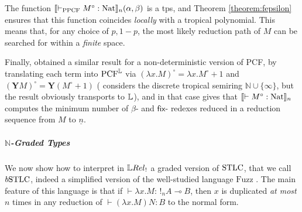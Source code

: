 \begin{remark}
The function $\llbracket\vdash_{\mathrm{PPCF}} M^{\circ}:\mathrm{Nat}\rrbracket_{n}(\alpha,\beta)$ is a tps, and Theorem \ref{theorem:fepsilon} ensures that this function coincides \emph{locally} with a tropical polynomial. This means that, for any choice of $p,1-p$, the most likely reduction path of $M$ can be searched for within a \emph{finite} space.
\end{remark}

Finally, \cite{Manzo2013} obtained a similar result for a non-deterministic version of PCF, by translating each term into $\mathrm{PCF}^{\mathbb{L}}$ via $(\lambda x.M)^{\circ}=\lambda x.M^{\circ}+1$ and $(\mathbf YM)^{\circ}= \mathbf Y(M^{\circ}+1)$
(\cite{Manzo2013} considers the discrete tropical semiring $\mathbb N\cup\{\infty\}$, but the result obviously transports to $\mathbb{L}$), and in that case \cite[Corollary VI.10]{Manzo2013} gives that $\llbracket\vdash M^{\circ}:\mathrm{Nat}\rrbracket_{n}$ computes the minimum number of $\beta$- and $\mathsf{fix}$- redexes reduced in a reduction sequence from $M $ to $\underline n$. 


 

\subparagraph*{$\mathbb N$-Graded Types}\label{sec:BSTLC}

We now show how to interpret in $\LREL_{!}$ a graded version of $\mathrm{STLC}$, that we call $\BSTLC$, indeed a simplified version of the well-studied language $\mathrm{Fuzz}$ \cite{Reed2010}. The main feature of this language is that if $\vdash \lambda x.M:\,!_nA\multimap B$, then $x$ is duplicated \emph{at most} $n$ times in any reduction of $\vdash (\lambda x.M)N :B$ to the normal form.

